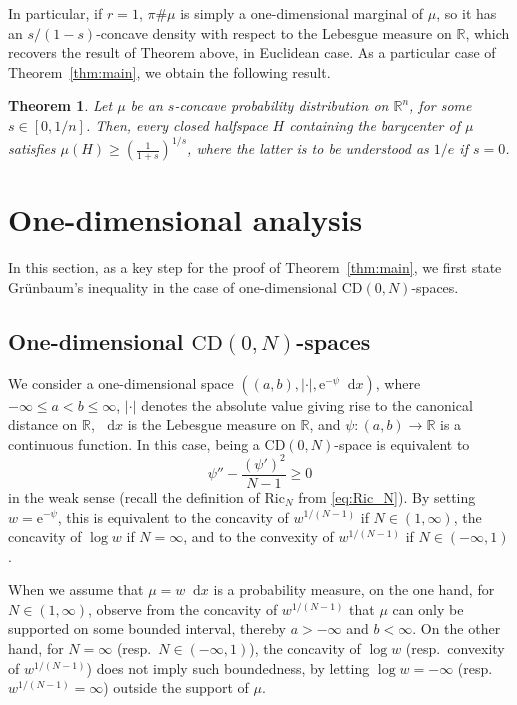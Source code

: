 \documentclass[sts]{imsart}
\newtheorem{theorem}{Theorem}[section]
\theoremstyle{definition}
\theoremstyle{remark}
\newcommand{\R}{\mathbb{R}}
\newcommand{\lra}{\longrightarrow}
\newcommand{\e}{\mathrm{e}}
\newcommand{\CD}{\mathrm{CD}}
\newcommand{\Ric}{\mathrm{Ric}}
\newcommand*\diff{\mathop{}\!\mathrm{d}}
\begin{document}
In particular, if $r=1$, $\pi\#\mu$ is simply a one-dimensional marginal of $\mu$, so it has an $s/(1-s)$-concave density with respect to the Lebesgue measure on $\R$, which recovers the result of Theorem above, in Euclidean case. As a particular case of Theorem~\ref{thm:main}, we obtain the following result.

\begin{theorem}
    Let $\mu$ be an $s$-concave probability distribution on $\R^n$, for some $s\in [0,1/n]$. Then, every closed halfspace $H$ containing the barycenter of $\mu$ satisfies $\mu(H)\geq \left(\frac{1}{1+s}\right)^{1/s}$, where the latter is to be understood as $1/e$ if $s=0$. 
\end{theorem}
\fi%


\section{One-dimensional analysis}\label{sc:1d}%

In this section, as a key step for the proof of Theorem~\ref{thm:main}, we first state Gr\"{u}nbaum's inequality in the case of one-dimensional $\CD(0,N)$-spaces.

\subsection{One-dimensional $\CD(0,N)$-spaces}\label{ssc:1dCD}%

We consider a one-dimensional space $((a,b),|\cdot|,\e^{-\psi}\diff x)$, where $-\infty \le a<b \le \infty$, $|\cdot|$ denotes the absolute value giving rise to the canonical distance on $\R$, $\diff x$ is the Lebesgue measure on $\R$, and $\psi \colon (a,b) \lra \R$ is a continuous function.
In this case, being a $\CD(0,N)$-space is equivalent to
\begin{equation}\label{eq:CD0N}
\psi'' -\frac{(\psi')^2}{N-1} \ge 0
\end{equation}
in the weak sense (recall the definition of $\Ric_N$ from \eqref{eq:Ric_N}).
By setting $w=\e^{-\psi}$, this is equivalent to the concavity of $w^{1/(N-1)}$ if $N \in (1,\infty)$, the concavity of $\log w$ if $N=\infty$, and to the convexity of $w^{1/(N-1)}$ if $N \in (-\infty,1)$.

When we assume that $\mu=w \diff x$ is a probability measure, on the one hand, for $N \in (1,\infty)$, observe from the concavity of $w^{1/(N-1)}$ that $\mu$ can only be supported on some bounded interval, thereby $a>-\infty$ and $b<\infty$.
On the other hand, for $N=\infty$ (resp.\ $N \in (-\infty,1)$), the concavity of $\log w$ (resp.\ convexity of $w^{1/(N-1)}$) does not imply such boundedness, by letting $\log w=-\infty$ (resp.\ $w^{1/(N-1)}=\infty$) outside the support of $\mu$.
\end{document}
